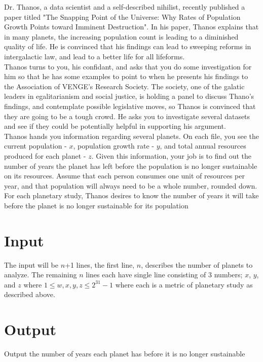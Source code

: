 
\noindent Dr. Thanos, a data scientist and a self-described nihilist, recently published a paper titled "The Snapping Point of the Universe: Why Rates of Population Growth Points toward Imminent Destruction". In his paper, Thanos explains that in many planets, the increasing population count is leading to a diminished quality of life. He is convinced that his findings can lead to sweeping reforms in intergalactic law, and lead to a better life for all lifeforms.\\

\noindent Thanos turns to you, his confidant, and asks that you do some investigation for him so that he has some examples to point to when he presents his findings to the Association of VENGE's Research Society. The society, one of the galatic leaders in egalitarianism and social justice, is holding a panel to discuss Thano's findings, and contemplate possible legislative moves, so Thanos is convinced that they are going to be a tough crowd. He asks you to investigate several datasets and see if they could be potentially helpful in supporting his argument.\\

\noindent Thanos hands you information regarding several planets. On each file, you see the current population - $x$, population growth rate - $y$, and total annual resources produced for each planet - $z$. Given this information, your job is to find out the number of years the planet has left before the population is no longer sustainable on its resources. Assume that each person consumes one unit of resources per year, and that population will always need to be a whole number, rounded down.\\

\noindent For each planetary study, Thanos desires to know the number of years it will take before the planet is no longer sustainable for its population\\

\section*{Input}
The input will be $n$+1 lines, the first line, $n$, describes the number of planets to analyze.
The remaining $n$ lines each have single line consisting of 3 numbers; $x$, $y$, and $z$ where $1 \leq w, x, y, z \leq 2^{31} - 1$ where each is a metric of planetary study as described above.

\section*{Output}
Output the number of years each planet has before it is no longer sustainable